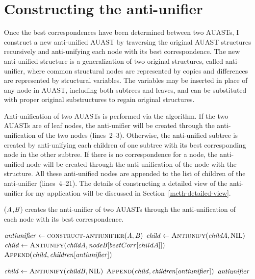 \section{Constructing the anti-unifier} \label{meth-antiUnifier}
Once the best correspondences have been determined between two AUASTs, I construct a new anti-unified AUAST by traversing the original AUAST structures recursively and anti-unifying each node with its best correspondence. The new anti-unified structure is a generalization of two original structures, called anti-unifier, where common structural nodes are represented by copies and differences are represented by structural variables. The variables may be inserted in place of any node in AUAST, including both subtrees and leaves, and can be substituted with proper original substructures to regain original structures.



Anti-unification of two AUASTs is performed via the  algorithm. If the two AUASTs are of leaf nodes, the anti-unifier will be created through the anti-unification of the two nodes (lines~2--3). Otherwise, the anti-unified subtree is created by anti-unifying each children of one subtree with its best corresponding node in the other subtree. If there is no correspondence for a node, the anti-unified node will be created through the anti-unification of the node with the \NIL{} structure. All these anti-unified nodes are appended to the list of children of the anti-unifier (lines~4--21). The details of constructing a detailed view of the anti-unifier for my application will be discussed in Section~\ref{meth-detailed-view}.


\begin{algorithm}
 \caption{($\mathit{A}$,$\mathit{B}$) creates the anti-unifier of two AUASTs through the anti-unification of each node with its best correspondence.}
  \label{AntiUnify}
  \begin{algorithmic}[1]
\AntiUnify
{}
  \State $\mathit{antiunifier} \gets   \textsc{construct-antiunifier}(\mathit{A},\mathit{B})$
  \State $\mathit{child} \gets   \textsc{Antiunify}(\mathit{childA},\textrm{NIL})$
\Else	
 \State $\mathit{child} \gets   \textsc{Antiunify}(\mathit{childA},\mathit{nodeB}[bestCorr[childA]])$
\EndIf
\State $\textsc{Append}(\mathit{child},\mathit{children[antiunifier]})$
\EndFor
\EndIf

  \State $\mathit{child} \gets   \textsc{Antiunify}(\mathit{childB},\textrm{NIL})$
\EndIf
\State $\textsc{Append}(\mathit{child},\mathit{children[antiunifier]})$
\EndFor
 \EndIf
\Return $\mathit{antiunifier}$
\end{algorithmic}
\end{algorithm}

